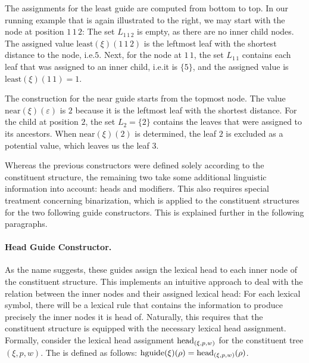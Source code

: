 \documentclass[../../document.tex]{subfiles}
\begin{document}
    \needspace{3cm}
    \begin{wrapfigure}[6]{r}{.3\linewidth}
        \centering
        
    \end{wrapfigure}
    The assignments for the least guide are computed from bottom to top.
    In our running example that is again illustrated to the right, we may start with the node at position \(1\,1\,2\): The set \(L_{1\,1\,2}\) is empty, as there are no inner child nodes. The assigned value \(\mathrm{least}(\xi)(1\,1\,2)\) is the leftmost leaf with the shortest distance to the node, i.e.\@ \(5\).
    Next, for the node at \(1\,1\), the set \(L_{1\,1}\) contains each leaf that was assigned to an inner child, i.e.\@ it is \(\{5\}\), and the assigned value is \(\mathrm{least}(\xi)(1\,1) = 1\).
    \exampleqed

    \begin{example}
        The construction for the near guide starts from the topmost node.
        The value \(\mathrm{near}(\xi)(\varepsilon)\) is \(2\) because it is the leftmost leaf with the shortest distance.
        For the child at position \(2\), the set \(L_{2} = \{2\}\) contains the leaves that were assigned to its ancestors.
        When \(\mathrm{near}(\xi)(2)\) is determined, the leaf \(2\) is excluded as a potential value, which leaves us the leaf \(3\).
    \end{example}

    Whereas the previous constructors were defined solely according to the constituent structure, the remaining two take some additional linguistic information into account: heads and modifiers.
    This also requires special treatment concerning binarization, which is applied to the constituent structures for the two following guide constructors.
    This is explained further in the following paragraphs.

    \paragraph{Head Guide Constructor.}
    As the name suggests, these guides assign the lexical head to each inner node of the constituent structure.
    This implements an intuitive approach to deal with the relation between the inner nodes and their assigned lexical head: For each lexical symbol, there will be a lexical rule that contains the information to produce precisely the inner nodes it is head of.
    Naturally, this requires that the constituent structure is equipped with the necessary lexical head assignment.
    Formally, consider the lexical head assignment \(\operatorname{head}_{(\xi,p,w)}\) for the constituent tree \((\xi, p, w)\).
    The  is defined as follows: \(\mathrm{hguide}(\xi)(\rho) = \operatorname{head}_{(\xi,p,w)}(\rho)\).
\end{document}
